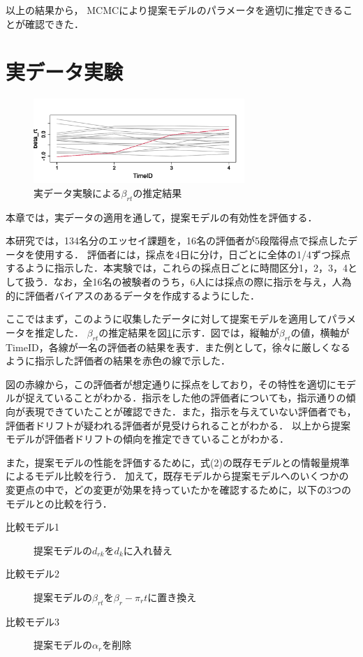 \documentclass[dvipdfmx, twocolumn, a4paper]{hcresume}
\begin{document}
以上の結果から， MCMCにより提案モデルのパラメータを適切に推定できることが確認できた．

\section{実データ実験}
\begin{figure}[b]
  \centering
 \includegraphics[width=8cm]{img/beta_rt_img_4.png}
 \vskip3mm
 \caption{実データ実験による$\beta_{rt}$の推定結果}
  \label{beta_rt_data}
\end{figure}
本章では，実データの適用を通して，提案モデルの有効性を評価する．

本研究では，134名分のエッセイ課題を，16名の評価者が5段階得点で採点したデータを使用する．
評価者には，採点を4日に分け，日ごとに全体の1/4ずつ採点するように指示した．本実験では，これらの採点日ごとに時間区分1，2，3，4として扱う．なお，全16名の被験者のうち，6人には採点の際に指示を与え，人為的に評価者バイアスのあるデータを作成するようにした．

ここではまず，このように収集したデータに対して提案モデルを適用してパラメータを推定した．
$\beta_{rt}$の推定結果を図\ref{beta_rt_data}に示す．図では，縦軸が$\beta_{rt}$の値，横軸がTimeID，各線が一名の評価者の結果を表す．また例として，徐々に厳しくなるように指示した評価者の結果を赤色の線で示した．

図の赤線から，この評価者が想定通りに採点をしており，その特性を適切にモデルが捉えていることがわかる．指示をした他の評価者についても，指示通りの傾向が表現できていたことが確認できた．また，指示を与えていない評価者でも，評価者ドリフトが疑われる評価者が見受けられることがわかる．
以上から提案モデルが評価者ドリフトの傾向を推定できていることがわかる．


また，提案モデルの性能を評価するために，式(2)の既存モデルとの情報量規準によるモデル比較を行う．
加えて，既存モデルから提案モデルへのいくつかの変更点の中で，どの変更が効果を持っていたかを確認するために，以下の3つのモデルとの比較を行う．

\begin{description}
\item [比較モデル1]提案モデルの$d_{rk}$を$d_k$に入れ替え
\item [比較モデル2]提案モデルの$\beta_{rt}$を$\beta_{r} - \pi_{r}t$に置き換え
\item [比較モデル3]提案モデルの$\alpha_r$を削除
\end{description}
\end{document}
